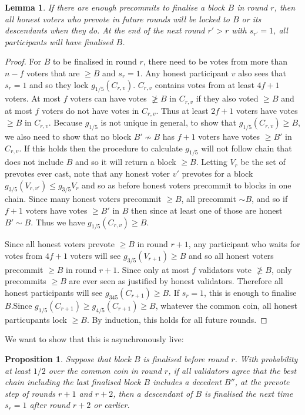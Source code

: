 \documentclass{article}
\newtheorem{lemma}[theorem]{Lemma}
\newtheorem{proposition}[theorem]{Proposition}
\begin{document}
{\begin{lemma} \label{lem:possibly-final-implies-permanent-lock}
If there are enough precommits to finalise a block $B$ in round $r$, then all honest voters who prevote in future rounds will be locked to $B$ or its descendants when they do. At the end of the next round $r' > r$ with $s_{r'}=1$, all participants will have finalised $B$.
\end{lemma}
\begin{proof}
For $B$ to be finalised in round $r$, there need to be votes from more than $n-f$ voters that are $\geq B$ and $s_r=1$. Any honest participant $v$ also sees that $s_r=1$ and so they lock $g_{1/5}(C_{r,v})$. $C_{r,v}$ contains votes from at least $4f+1$ voters. At most $f$  voters can have votes  $\not\geq B$ in $C_{r,v}$ if they also voted $\geq B$ and at most $f$ voters do not have votes in $C_{r,v}$.
 Thus at least $2f+1$ voters have votes $\geq B$ in $C_{r,v}$. Because $g_{1/5}$ is not unique in general, to show that $g_{1/5}(C_{r,v}) \geq B$, we also need to show that no block $B' \nsim B$ has $f+1$ voters have votes $\geq B'$ in $C_{r,v}$. If this holds then the procedure to calculate $g_{1/5}$ will not follow chain that does not include $B$ and so it will return a block $\geq B$.
 Letting $V_r$ be the set of prevotes ever cast, note that any honest voter $v'$ prevotes for a block $g_{3/5}(V_{r,v'}) \leq g_{3/5}{V_r}$ and so as before honest voters precommit to blocks in one chain. Since many honest voters precommit $\geq B$, all precommit $\sim B$, and so if $f+1$ voters have votes $\geq B'$ in $B$ then since at least one of those are honest $B' \sim B$. Thus we have $g_{1/5}(C_{r,v}) \geq B$.

Since all honest voters prevote $\geq B$ in round $r+1$, any participant who waits for votes from $4f+1$ voters will see $g_{3/5}(V_{r+1}) \geq B$ and so all honest voters precommit $\geq B$ in round $r+1$. Since only at most $f$ validators vote $\not \geq B$, only precommits $\geq B$ are ever seen as justified by honest validators. Therefore all honest participants will see $g_{345}(C_{r+1}) \geq 
B$.
If $s_r=1$, this is enough to finalise $B$.Since $g_{1/5}(C_{r+1}) \geq g_{4/5}(C_{r+1}) \geq 
B$, whatever the common coin, all honest particupants lock $\geq B$. By induction, this holds for all future rounds.

\end{proof}

We want to show that this is asynchronously live:

\begin{proposition} Suppose that block $B$ is finalised before round $r$. With probability at least $1/2$ over the common coin in round $r$, if all validators agree that the best chain including the last finalised block $B$ includes a decedent $B''$, at the prevote step of rounds $r+1$ and $r+2$, then a descendant of $B$ is finalised the next time $s_r=1$ after round $r+2$ or earlier.
\end{proposition}

}
\end{document}
